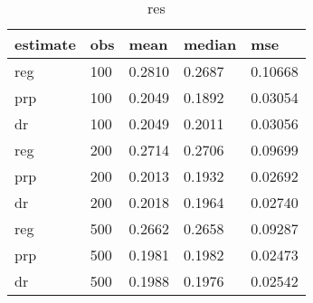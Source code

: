 \begin{table}[ht]
\begin{center}
\begin{tabular}{lllll}
  \hline
estimate & obs & mean & median & mse \\ 
  \hline
reg & 100 & 0.2810 & 0.2687 & 0.10668 \\ 
  prp & 100 & 0.2049 & 0.1892 & 0.03054 \\ 
  dr & 100 & 0.2049 & 0.2011 & 0.03056 \\ 
  reg & 200 & 0.2714 & 0.2706 & 0.09699 \\ 
  prp & 200 & 0.2013 & 0.1932 & 0.02692 \\ 
  dr & 200 & 0.2018 & 0.1964 & 0.02740 \\ 
  reg & 500 & 0.2662 & 0.2658 & 0.09287 \\ 
  prp & 500 & 0.1981 & 0.1982 & 0.02473 \\ 
  dr & 500 & 0.1988 & 0.1976 & 0.02542 \\ 
   \hline
\end{tabular}
\caption{res}
\end{center}
\end{table}
